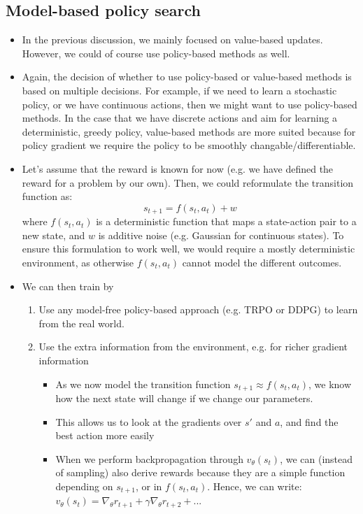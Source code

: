 \subsection{Model-based policy search}
\begin{itemize}
	\item In the previous discussion, we mainly focused on value-based updates. However, we could of course use policy-based methods as well.
	\item Again, the decision of whether to use policy-based or value-based methods is based on multiple decisions. For example, if we need to learn a stochastic policy, or we have continuous actions, then we might want to use policy-based methods. In the case that we have discrete actions and aim for learning a deterministic, greedy policy, value-based methods are more suited because for policy gradient we require the policy to be smoothly changable/differentiable.
	\item Let's assume that the reward is known for now (e.g. we have defined the reward for a problem by our own). Then, we could reformulate the transition function as:
	$$s_{t+1} = f(s_t, a_t) + w$$
	where $f(s_t, a_t)$ is a deterministic function that maps a state-action pair to a new state, and $w$ is additive noise (e.g. Gaussian for continuous states). To ensure this formulation to work well, we would require a mostly deterministic environment, as otherwise $f(s_t, a_t)$ cannot model the different outcomes.
	\item We can then train by
	\begin{enumerate}
		\item Use any model-free policy-based approach (e.g. TRPO or DDPG) to learn from the real world.
		\item Use the extra information from the environment, e.g. for richer gradient information
		\begin{itemize}
			\item As we now model the transition function $s_{t+1}\approx f(s_t, a_t)$, we know how the next state will change if we change our parameters.
			\item This allows us to look at the gradients over $s'$ and $a$, and find the best action more easily
			\item When we perform backpropagation through $v_{\theta}(s_t)$, we can (instead of sampling) also derive rewards because they are a simple function depending on $s_{t+1}$, or in $f(s_t,a_t)$. Hence, we can write:
			$v_{\theta}(s_t)=\nabla_{\theta} r_{t+1}+\gamma \nabla_{\theta} r_{t+2}+...$
		\end{itemize}
	\end{enumerate}
\end{itemize}
